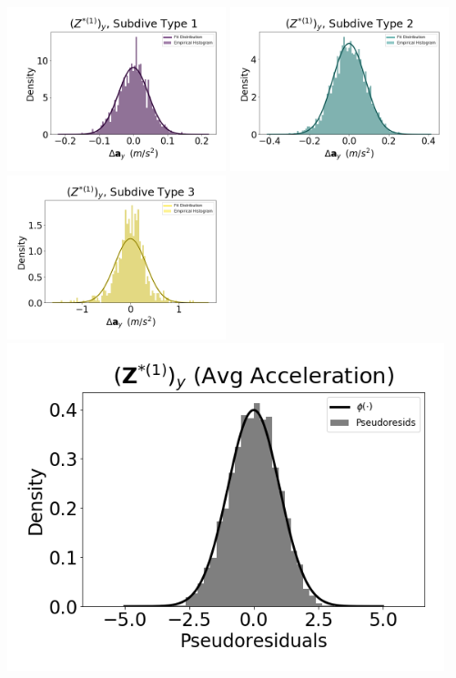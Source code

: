 \documentclass[12pt]{TD-CJS}
\begin{document}
\newpage

\includegraphics[width=2.5in]{../Plots/CarHHMM2_empirical_hist_Ay_0.png}
\includegraphics[width=2.5in]{../Plots/CarHHMM2_empirical_hist_Ay_1.png}
\includegraphics[width=2.5in]{../Plots/CarHHMM2_empirical_hist_Ay_2.png}
\includegraphics[width=5in]{../Plots/CarHHMM2_psedoresids_Ay.png}
\end{document}
